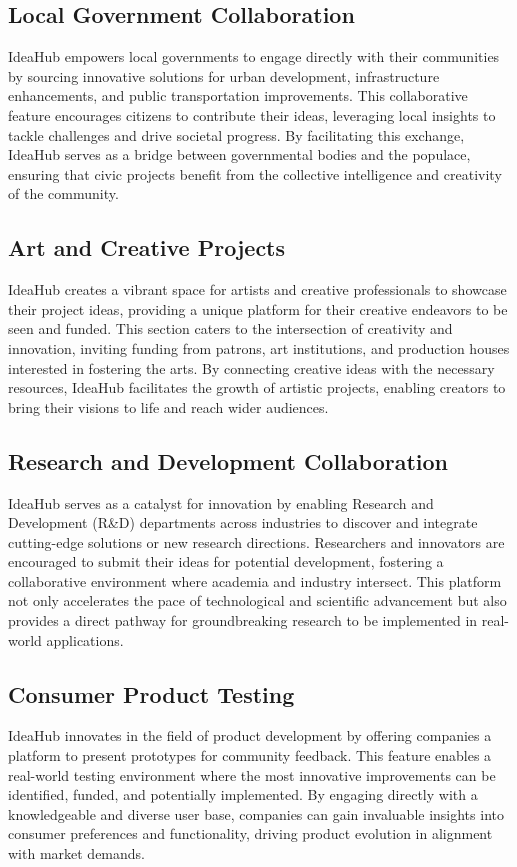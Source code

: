 \documentclass{article}
\begin{document}
	
	\subsection{Local Government Collaboration}
	IdeaHub empowers local governments to engage directly with their communities by sourcing innovative solutions for urban development, infrastructure enhancements, and public transportation improvements. This collaborative feature encourages citizens to contribute their ideas, leveraging local insights to tackle challenges and drive societal progress. By facilitating this exchange, IdeaHub serves as a bridge between governmental bodies and the populace, ensuring that civic projects benefit from the collective intelligence and creativity of the community.
	
	
	\subsection{Art and Creative Projects}
	IdeaHub creates a vibrant space for artists and creative professionals to showcase their project ideas, providing a unique platform for their creative endeavors to be seen and funded. This section caters to the intersection of creativity and innovation, inviting funding from patrons, art institutions, and production houses interested in fostering the arts. By connecting creative ideas with the necessary resources, IdeaHub facilitates the growth of artistic projects, enabling creators to bring their visions to life and reach wider audiences.
	
	
	\subsection{Research and Development Collaboration}
	IdeaHub serves as a catalyst for innovation by enabling Research and Development (R\&D) departments across industries to discover and integrate cutting-edge solutions or new research directions. Researchers and innovators are encouraged to submit their ideas for potential development, fostering a collaborative environment where academia and industry intersect. This platform not only accelerates the pace of technological and scientific advancement but also provides a direct pathway for groundbreaking research to be implemented in real-world applications.
	
	
	\subsection{Consumer Product Testing}
	IdeaHub innovates in the field of product development by offering companies a platform to present prototypes for community feedback. This feature enables a real-world testing environment where the most innovative improvements can be identified, funded, and potentially implemented. By engaging directly with a knowledgeable and diverse user base, companies can gain invaluable insights into consumer preferences and functionality, driving product evolution in alignment with market demands.
	
\end{document}
